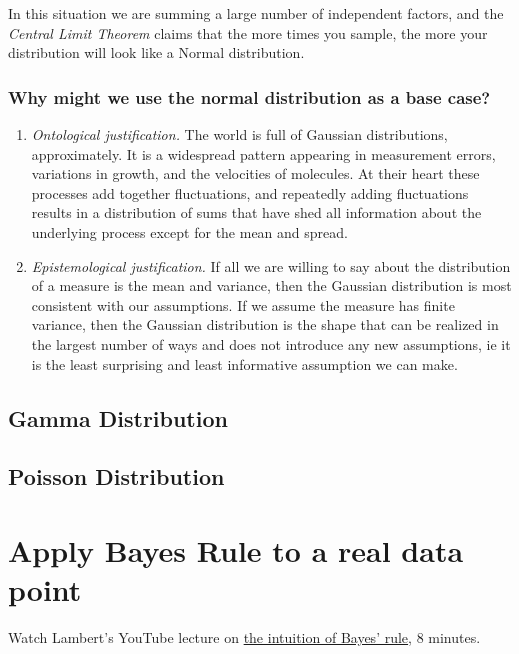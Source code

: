 \documentclass[]{article}
\begin{document}
In this situation we are summing a large number of independent factors, and the \emph{Central Limit Theorem} claims that the more times you sample, the more your distribution will look like a Normal distribution.

\subsubsection{Why might we use the normal distribution as a base case?}

\begin{enumerate}
\item
  \emph{Ontological justification.} The world is full of Gaussian
  distributions, approximately. It is a widespread pattern appearing in
  measurement errors, variations in growth, and the velocities of
  molecules. At their heart these processes add together fluctuations,
  and repeatedly adding fluctuations results in a distribution of sums
  that have shed all information about the underlying process except for
  the mean and spread.
\item
  \emph{Epistemological justification.} If all we are willing to say
  about the distribution of a measure is the mean and variance, then the
  Gaussian distribution is most consistent with our assumptions. If we
  assume the measure has finite variance, then the Gaussian distribution
  is the shape that can be realized in the largest number of ways and
  does not introduce any new assumptions, ie it is the least surprising
  and least informative assumption we can make.
\end{enumerate}


\subsection{Gamma Distribution}

\subsection{Poisson Distribution}

\section{Apply Bayes Rule to a real data point}

Watch Lambert's YouTube lecture on \href{https://youtu.be/yvWlpwnT1nw}{the intuition of Bayes' rule}, 8 minutes.
\end{document}
